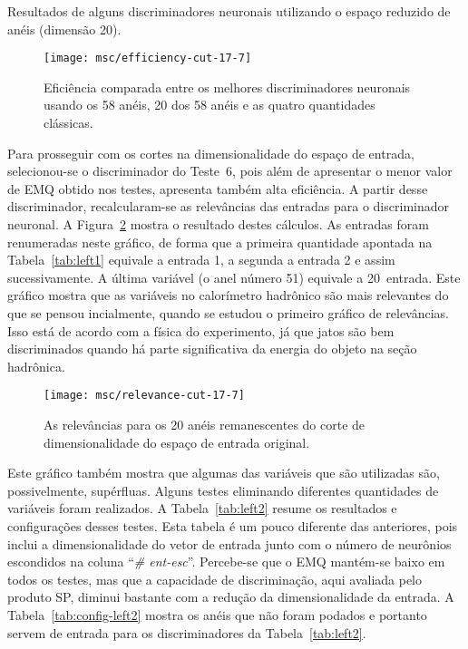 \begin{table}
\caption{Resultados de alguns discriminadores neuronais utilizando o espaço
reduzido de anéis (dimensão 20).}
\label{tab:cut-relev-ring}
\begin{center}
\small
\renewcommand{\baselinestretch}{1}
\begin{sideways}

\end{sideways}
\normalsize
\renewcommand{\baselinestretch}{1.5}
\end{center}
\end{table}

\begin{figure}
\begin{center}
\texttt{[image: msc/efficiency-cut-17-7]}
\end{center}
\caption{Eficiência comparada entre os melhores discriminadores neuronais
usando os 58 anéis, 20 dos 58 anéis e as quatro quantidades clássicas.}
\label{fig:eff-cut1}
\end{figure}

Para prosseguir com os cortes na dimensionalidade do espaço de entrada,
selecionou-se o discriminador do Teste~6, pois além de apresentar o menor
valor de EMQ obtido nos testes, apresenta também alta eficiência. A partir
desse discriminador, recalcularam-se as relevâncias das entradas para o
discriminador neuronal. A Figura~\ref{fig:rel-cut1} mostra o resultado destes
cálculos. As entradas foram renumeradas neste gráfico, de forma que a primeira
quantidade apontada na Tabela~\ref{tab:left1} equivale a entrada 1, a segunda
a entrada 2 e assim sucessivamente. A última variável (o anel número 51)
equivale a 20\eira\ entrada. Este gráfico mostra que as variáveis no
calorímetro hadrônico são mais relevantes do que se pensou incialmente, quando
se estudou o primeiro gráfico de relevâncias. Isso está de acordo com a física
do experimento, já que jatos são bem discriminados quando há parte
significativa da energia do objeto na seção hadrônica.

\begin{figure}
\begin{center}
\texttt{[image: msc/relevance-cut-17-7]}
\end{center}
\caption{As relevâncias para os 20 anéis remanescentes do corte de
dimensionalidade do espaço de entrada original.}
\label{fig:rel-cut1}
\end{figure}

Este gráfico também mostra que algumas das variáveis que são utilizadas são,
possivelmente, supérfluas. Alguns testes eliminando diferentes quantidades de
variáveis foram realizados. A Tabela~\ref{tab:left2} resume os resultados e
configurações desses testes. Esta tabela é um pouco diferente das anteriores,
pois inclui a dimensionalidade do vetor de entrada junto com o número de
neurônios escondidos na coluna ``\emph{\# ent-esc}''. Percebe-se que o EMQ
mantém-se baixo em todos os testes, mas que a capacidade de discriminação, aqui
avaliada pelo produto SP, diminui bastante com a redução da dimensionalidade da
entrada. A Tabela~\ref{tab:config-left2} mostra os anéis que não foram podados
e portanto servem de entrada para os discriminadores da Tabela~\ref{tab:left2}.

